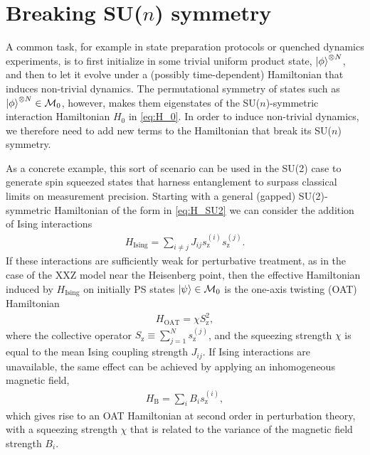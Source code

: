 \documentclass[nofootinbib,notitlepage,11pt]{revtex4-2}
\renewcommand{\t}{\text} %
\newcommand{\1}{\mathds{1}}
\newcommand{\z}{\text{z}}
\newcommand{\M}{\mathcal{M}}
\begin{document}
\section{Breaking SU($n$) symmetry}
\label{sec:breaking_sun}

A common task, for example in state preparation protocols or quenched dynamics experiments, is to first initialize in some trivial uniform product state, $\ket\phi^{\otimes N}$, and then to let it evolve under a (possibly time-dependent) Hamiltonian that induces non-trivial dynamics.
The permutational symmetry of states such as $\ket\phi^{\otimes N}\in\M_0$, however, makes them eigenstates of the SU($n$)-symmetric interaction Hamiltonian $H_0$ in \eqref{eq:H_0}.
In order to induce non-trivial dynamics, we therefore need to add new terms to the Hamiltonian that break its SU($n$) symmetry.

As a concrete example, this sort of scenario can be used in the SU(2) case to generate spin squeezed states that harness entanglement to surpass classical limits on measurement precision\cite{he2019engineering, perlin2020spin}.
Starting with a general (gapped) SU(2)-symmetric Hamiltonian of the form in \eqref{eq:H_SU2} we can consider the addition of Ising interactions
\begin{align}
  H_{\t{Ising}} = \sum_{i\ne j} J_{ij} s_\z^{(i)} s_\z^{(j)}.
  \label{eq:Ising}
\end{align}
If these interactions are sufficiently weak for perturbative treatment, as in the case of the XXZ model near the Heisenberg point, then the effective Hamiltonian induced by $H_{\t{Ising}}$ on initially PS states $\ket\psi\in\M_0$ is the one-axis twisting (OAT) Hamiltonian\cite{ma2011quantum}
\begin{align}
  H_{\t{OAT}} = \chi S_\z^2,
  \label{eq:OAT}
\end{align}
where the collective operator $S_\z\equiv\sum_{j=1}^Ns_\z^{(j)}$, and the squeezing strength $\chi$ is equal to the mean Ising coupling strength $J_{ij}$.
If Ising interactions are unavailable, the same effect can be achieved by applying an inhomogeneous magnetic field,
\begin{align}
  H_{\t{B}} = \sum_i B_i s_\z^{(i)},
  \label{eq:magnetic}
\end{align}
which gives rise to an OAT Hamiltonian at second order in perturbation theory, with a squeezing strength $\chi$ that is related to the variance of the magnetic field strength $B_i$.
\end{document}
